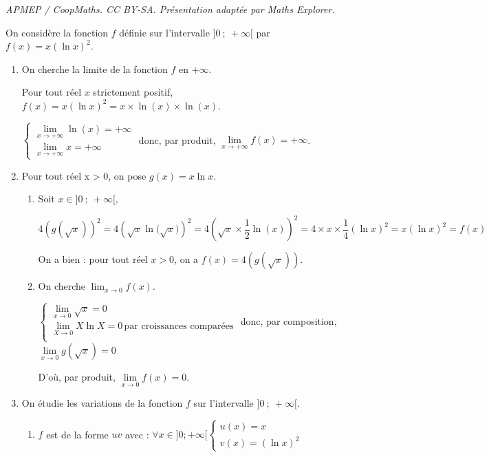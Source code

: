 \documentclass[10pt]{article}
\begin{document}
\noindent\textit{APMEP / CoopMaths. CC BY-SA. Présentation adaptée par Maths Explorer.}\par\medskip
On considère la fonction $f$ définie sur l'intervalle $]0~;~+\infty[$ par
$f(x) = x(\ln x)^2$.





\begin{enumerate}
	\item On cherche la limite de la fonction $f$ en $+\infty$.

	Pour tout réel $x$ strictement positif, $f(x)=x\left(\ln x\right)^2=x \times \ln(x) \times \ln(x)$. 
	
	$\begin{cases}
		\lim\limits_{x \to +\infty} \ln(x)= +\infty\\
		\lim\limits_{x\to +\infty}  x = +\infty
	\end{cases}$ donc, par produit,  $\lim\limits_{x \to +\infty} f(x)= +\infty$.
	
	\item Pour tout réel x > 0, on pose $g(x) = x\ln x$.
	\begin{enumerate}
		\item Soit $x \in ]0~;~+\infty[$, 

		$4\left(g\left(\sqrt x\right)\right) ^2= 4 \left( \sqrt{x} \ln\big(\sqrt{x}\big) \right) ^2= 4 \left( \sqrt{x} \times \dfrac{1}{2} \ln(x)\right)^2 = 4 \times x \times \dfrac{1}{4} \left( \ln x\right) ^2 = x \left( \ln x\right) ^2 =f(x)$

On a bien :  pour tout réel $x > 0$, on a $f(x) = 4\left(g\left(\sqrt x\right)\right)$.
		\item On cherche $\displaystyle\lim_{x \to 0} f(x)$.

$\begin{cases}
\lim\limits_{x \to 0} \sqrt{x} =0 \\
\lim\limits_{X \to 0} X\ln X = 0 \, \text{par croissances comparées} \\
\end{cases}$ donc, par composition, $\lim\limits_{x\to 0} g(\sqrt x)=0$

D'où, par produit, $\lim\limits_{x\to 0} f(x)=0$. 
	\end{enumerate}
\item On étudie les variations de la fonction $f$ sur l'intervalle $]0~;~+\infty[$.
	\begin{enumerate}
		\item $f$ est de la forme $uv$ avec : \quad $\forall x \in ]0;+\infty[  \begin{cases}
u(x)=x\\ v(x)=(\ln x)^2\end{cases}$


\end{enumerate}
\end{enumerate}
\end{document}
